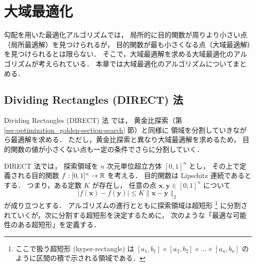 %

\chapter{大域最適化}

勾配を用いた最適化アルゴリズムでは，
局所的に目的関数が周りより小さい点（局所最適解）を見つけられるが，
目的関数が最も小さくなる点（大域最適解）を見つけられるとは限らない．
そこで，大域最適解を求める大域最適化のアルゴリズムが考えられている．
本章では大域最適化のアルゴリズムについてまとめる．

\section{Dividing Rectangles (DIRECT) 法}\label{sec:optimization_direct}

Dividing Rectangles (DIRECT) 法 \cite{Jones1993} では，
黄金比探索（第 \ref{sec:optimization_golden-section-search} 節）と同様に
領域を分割していきながら最適解を求める．
ただし，黄金比探索と異なり大域最適解を求めるため，
目的関数の値が小さくない点も一定の条件でさらに分割していく．

DIRECT 法では，
探索領域を $n$ 次元単位超立方体 $[0, 1]^n$ とし，
その上で定義される目的関数 $f : [0, 1]^n \to \mathbb{R}$ を考える．
目的関数は  Lipschitz 連続であるとする．
つまり，ある定数 $K$ が存在し，
任意の点 $\bm{x}, \bm{y} \in [0, 1]^n$ について
\begin{equation}
    |f(\bm{x}) - f(\bm{y})| \le K \|\bm{x} - \bm{y}\|_2
\end{equation}
が成り立つとする．
アルゴリズムの進行とともに探索領域は超短形
\footnote{ここで扱う超短形 (hyper-rectangle) は%
    $[a_1, b_1] \times [a_2, b_2] \times \ldots \times [a_n, b_n]$%
    のように区間の積で示される領域である．}
に分割されていくが，次に分割する超短形を決定するために，
次のような「最適な可能性のある超短形」を定義する．

